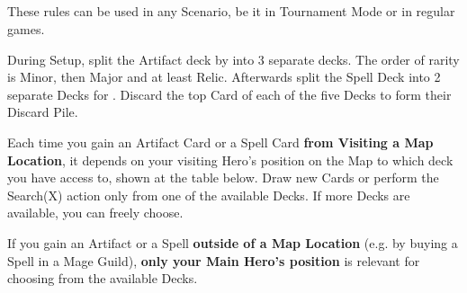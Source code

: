 \begin{multicols*}{2}
\subsection*{}

These rules can be used in any Scenario, be it in Tournament Mode or in regular games.

During Setup, split the Artifact deck by  into 3 separate decks.
The order of rarity is Minor, then Major and at least Relic.
Afterwards split the Spell Deck into 2 separate Decks for . Discard the top Card of each of the five Decks to form their Discard Pile.

Each time you gain an Artifact Card or a Spell Card \textbf{from Visiting a Map Location}, it depends on your visiting Hero's position on the Map to which deck you have access to, shown at the table below. Draw new Cards or perform the Search(X) action only from one of the available Decks. If more Decks are available, you can freely choose.


If you gain an Artifact or a Spell \textbf{outside of a Map Location} (e.g. by buying a Spell in a Mage Guild), \textbf{only your Main Hero's position} is relevant for choosing from the available Decks.

\end{multicols*}
